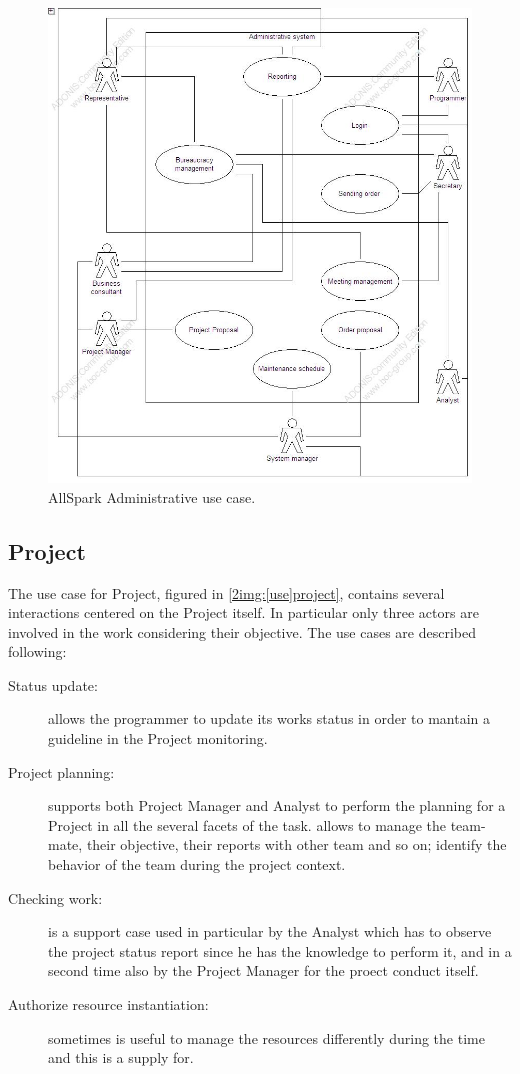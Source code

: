 \begin{figure}
\begin{centering}
\includegraphics[scale=0.35]{assign3/adonis/imgs/administrative.jpg}
\caption{AllSpark Administrative use case.}
\label{2img:[use]administrative}
\end{centering}
\end{figure}


\subsection{Project}
The use case for Project, figured in \ref{2img:[use]project}, contains several interactions centered on the Project itself. In particular only three actors are involved in the work considering their objective.
The use cases are described following:
\begin{description}
\item[Status update:] allows the programmer to update its works status in order to mantain a guideline in the Project monitoring.
\item[Project planning:] supports both Project Manager and Analyst to perform the planning for a Project in all the several facets of the task.
 allows to manage the team-mate, their objective, their reports with other team and so on;
 identify the behavior of the team during the project context.
\item[Checking work:] is a support case used in particular by the Analyst which has to observe the project status report since he has the knowledge to perform it, and in a second time also by the Project Manager for the proect conduct itself.
\item[Authorize resource instantiation:] sometimes is useful to manage the resources differently during the time and this is a supply for.
\end{description}

